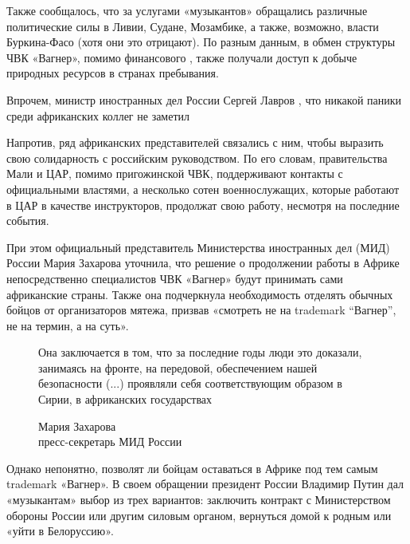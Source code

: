 Также сообщалось, что за услугами «музыкантов» обращались различные политические силы в Ливии, Судане, Мозамбике, а также, возможно, власти Буркина-Фасо (хотя они это отрицают). По разным данным, в обмен структуры ЧВК «Вагнер», помимо финансового , также получали доступ к добыче природных ресурсов в странах пребывания.

\begin{center}
    \Large

    Впрочем, министр иностранных дел России Сергей Лавров , что никакой паники среди африканских коллег не заметил
\end{center}

Напротив, ряд африканских представителей связались с ним, чтобы выразить свою солидарность с российским руководством. По его словам, правительства Мали и ЦАР, помимо пригожинской ЧВК, поддерживают контакты с официальными властями, а несколько сотен военнослужащих, которые работают в ЦАР в качестве инструкторов, продолжат свою работу, несмотря на последние события.

При этом официальный представитель Министерства иностранных дел (МИД) России Мария Захарова уточнила, что решение о продолжении работы в Африке непосредственно специалистов ЧВК «Вагнер» будут принимать сами африканские страны. Также она подчеркнула необходимость отделять обычных бойцов от организаторов мятежа, призвав «смотреть не на trademark ``Вагнер'', не на термин, а на суть».

\begin{figure}
    \begin{fancyquotes}
        Она заключается в том, что за последние годы люди это доказали, занимаясь на фронте, на передовой, обеспечением нашей безопасности (...) проявляли себя соответствующим образом в Сирии, в африканских государствах

        \begin{flushright}

            Мария Захарова\\

            пресс-секретарь МИД России
        \end{flushright}
    \end{fancyquotes}
\end{figure}
Однако непонятно, позволят ли бойцам оставаться в Африке под тем самым trademark «Вагнер». В своем обращении президент России Владимир Путин дал «музыкантам» выбор из трех вариантов: заключить контракт с Министерством обороны России или другим силовым органом, вернуться домой к родным или «уйти в Белоруссию».


